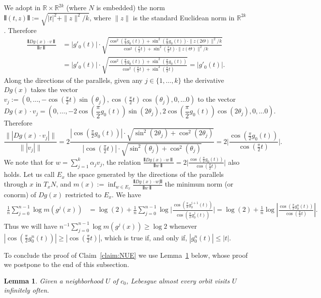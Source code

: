\documentclass[reqno,12pt,a4paper]{amsart}
\theoremstyle{plain}
\newtheorem{lemma}[theorem]{Lemma}
\theoremstyle{definition}
\providecommand{\abs}[1]{\lvert#1\rvert}
\providecommand{\Norm}[1]{\interleave#1\interleave}
\begin{document}
We adopt in ${{\mathbb R}} \times {{\mathbb R}}^{2k}$ (where $N$ is embedded)
the norm $\Norm{(t, z)}:= \sqrt{\abs{t}^2+ \|z\|^2/k}$,
where $\|z\|$ is the standard Euclidean norm in
${{\mathbb R}}^{2k}$. Therefore
\begin{align*}
  \frac{\Norm{Dg(x) \cdot v}}{\Norm{v}}
&= | g'_0(t)| \cdot
  \sqrt{\frac{\cos^2(\frac\pi2 g_0(t))+ \sin^2(\frac\pi2 g_0(t)) \cdot
      \|z(2\Theta)\|^2/k}{\cos^2(\frac\pi2 t)+ \sin^2(\frac\pi2 t) \cdot
      \|z(\Theta)\|^2/k} }
\\
&=
| g'_0(t)| \cdot \sqrt{\frac{\cos^2(\frac\pi2 g_0(t))+
    \sin^2(\frac\pi2 g_0(t))}{\cos^2(\frac\pi2 t)+
    \sin^2(\frac\pi2 t) } }= |g'_0(t)|.
\end{align*}
Along the directions of the parallels, given any $j\in \{1,
\dots, k\}$ the derivative $Dg(x)$ takes the vector $v_j:= (0,
\dots, -\cos(\frac\pi2 t)\sin(\theta_j), \cos(\frac\pi2 t)\cos(\theta_j), 0,
\dots 0)$ to the vector
$$
Dg(x) \cdot v_j= (0,  \dots, -2 \cos(\frac\pi2 g_0(t))\sin(2 \theta_j),
2\cos(\frac\pi2 g_0(t))\cos(2 \theta_j), 0, \dots 0).
$$
Therefore
$$
\frac{\||Dg(x) \cdot v_j|\|}{\||v_j|\|}
= 
2 \frac{|\cos(\frac\pi2 g_0(t))|
\cdot \sqrt{\sin^2(2\theta_j)+ \cos^2(2\theta_j)}}
{|\cos(\frac\pi2 t)|\cdot \sqrt{\sin^2(\theta_j)+
\cos^2(\theta_j)}} = 
2 \Big|\frac{\cos(\frac\pi2 g_0(t))}{\cos(\frac\pi2 t)}\Big|.
$$
We note that for $w= \sum_{j= 1}^k \alpha_j v_j$, the
relation $ \frac{\Norm{Dg(x) \cdot w}}{\Norm{w}}= 2
\Big|\frac{\cos(\frac\pi2 g_0(t))}{\cos(\frac\pi2 t)}\Big| $
also holds. Let us call $E_x$ the space generated by the
directions of the parallels through $x$ in $T_x N$, and
$m(x):= \inf_{w \in E_x} \frac{\Norm{Dg(x) \cdot
    w|}}{\Norm{w}}$ the minimum norm (or conorm) of $Dg(x)$
restricted to $E_x$. We have
\begin{align*}
  \frac 1 n \sum_{j= 0}^{n-1} \log m(g^j(x))
  &=
  \log(2) +
  \frac 1 n \sum_{j= 0}^{n-1} \log\Big|\frac{\cos(\frac\pi2
    g_0^{j+1}(t))}{\cos(\frac\pi2 g_0^{j}(t))}\Big|
= \log(2) +
  \frac1n
  \log\left|
      \frac{\cos(\frac\pi2 g_0^n(t))}{\cos(\frac\pi2 t)}
    \right|.
\end{align*}
Thus we will have $n^{-1} \sum_{j= 0}^{n-1} \log
m(g^j(x)) \ge \log 2$ whenever $|\cos(\frac\pi2 g_0^n(t))|\ge
|\cos(\frac\pi2 t)|$, which is true if, and only if,
$|g_0^n(t)|\le |t|$.

To conclude the proof of Claim~\ref{claim:NUE} we use
Lemma~\ref{le:alamane} below, whose proof we postpone to the
end of this subsection.
\begin{lemma}
  \label{le:alamane}
  Given a neighborhood $U$ of $c_0$, Lebesgue almost every
  orbit visits $U$ infinitely often.
\end{lemma}
\end{document}
